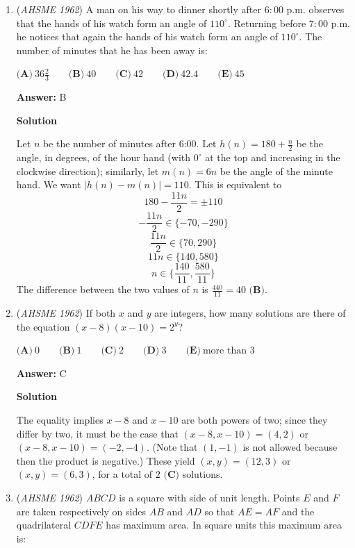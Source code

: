 \begin{enumerate}
	\item (\textit{AHSME 1962}) A man on his way to dinner shortly after $6{:}00$ p.m. observes that the hands of his watch form an angle of $110^\circ$. Returning before $7{:}00$ p.m. he notices that again the hands of his watch form an angle of $110^\circ$. The number of minutes that he has been away is:


 $\textbf{(A)}\ 36\frac{2}{3} \qquad  \textbf{(B)}\ 40 \qquad  \textbf{(C)}\ 42 \qquad  \textbf{(D)}\ 42.4 \qquad  \textbf{(E)}\ 45$

 \textbf{Answer: }B



\textbf{Solution}

Let $n$ be the number of minutes after 6:00. Let $h(n)=180+\frac{n}2$ be the angle, in degrees, of the hour hand (with $0^{\circ}$ at the top and increasing in the clockwise direction); similarly, let $m(n)=6n$ be the angle of the minute hand. We want $|h(n)-m(n)|=110$. This is equivalent to 
 \[180-\frac{11n}2=\pm110\]
 \[-\frac{11n}2\in\{-70,-290\}\]
 \[\frac{11n}2\in\{70,290\}\]
 \[11n\in\{140,580\}\]
 \[n\in\{\frac{140}{11},\frac{580}{11}\}\]The difference between the two values of $n$ is $\frac{440}{11}=\boxed{40\textbf{ (B)}}$.

 


	\item (\textit{AHSME 1962}) If both $x$ and $y$ are integers, how many solutions are there of the equation $(x - 8)(x - 10) = 2^y$?


 $\textbf{(A)}\ 0 \qquad  \textbf{(B)}\ 1 \qquad  \textbf{(C)}\ 2 \qquad  \textbf{(D)}\ 3 \qquad  \textbf{(E)}\ \text{more than } 3$

 \textbf{Answer: }C



\textbf{Solution}

The equality implies $x-8$ and $x-10$ are both powers of two; since they differ by two, it must be the case that $(x-8,x-10) = (4,2)$ or $(x-8,x-10) = (-2,-4)$.  (Note that $(1,-1)$ is not allowed because then the product is negative.) These yield $(x,y) = (12,3)$ or $(x,y) = (6,3)$, for a total of $\boxed{2\textbf{ (C)}}$ solutions.

 


	\item (\textit{AHSME 1962}) $ABCD$ is a square with side of unit length. Points $E$ and $F$ are taken respectively on sides $AB$ and $AD$ so that $AE = AF$ and the quadrilateral $CDFE$ has maximum area. In square units this maximum area is:



\end{enumerate}
